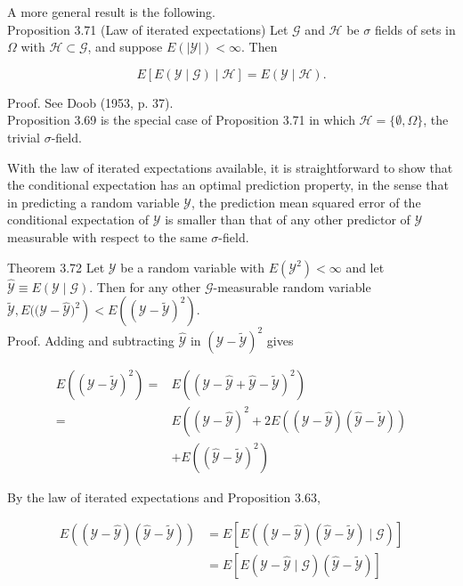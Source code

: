 \documentclass[10pt]{article}
\begin{document}
A more general result is the following.\\
Proposition 3.71 (Law of iterated expectations) Let $\mathcal{G}$ and $\mathcal{H}$ be $\sigma$ fields of sets in $\Omega$ with $\mathcal{H} \subset \mathcal{G}$, and suppose $E(|\mathcal{Y}|)<\infty$. Then

$$
E[E(\mathcal{Y} \mid \mathcal{G}) \mid \mathcal{H}]=E(\mathcal{Y} \mid \mathcal{H}) .
$$

Proof. See Doob (1953, p. 37).\\
Proposition 3.69 is the special case of Proposition 3.71 in which $\mathcal{H}= \{\emptyset, \Omega\}$, the trivial $\sigma$-field.

With the law of iterated expectations available, it is straightforward to show that the conditional expectation has an optimal prediction property, in the sense that in predicting a random variable $\mathcal{Y}$, the prediction mean squared error of the conditional expectation of $\mathcal{Y}$ is smaller than that of any other predictor of $\mathcal{Y}$ measurable with respect to the same $\sigma$-field.

Theorem 3.72 Let $\mathcal{Y}$ be a random variable with $E\left(\mathcal{Y}^{2}\right)<\infty$ and let $\hat{\mathcal{Y}} \equiv E(\mathcal{Y} \mid \mathcal{G})$. Then for any other $\mathcal{G}$-measurable random variable $\tilde{\mathcal{Y}}, E((\mathcal{Y}- \left.\hat{\mathcal{Y}})^{2}\right)<E\left((\mathcal{Y}-\tilde{\mathcal{Y}})^{2}\right)$.\\
Proof. Adding and subtracting $\hat{\mathcal{Y}}$ in $(\mathcal{Y}-\tilde{\mathcal{Y}})^{2}$ gives

$$
\begin{aligned}
E\left((\mathcal{Y}-\tilde{\mathcal{Y}})^{2}\right)= & E\left((\mathcal{Y}-\hat{\mathcal{Y}}+\hat{\mathcal{Y}}-\tilde{\mathcal{Y}})^{2}\right) \\
= & E\left((\mathcal{Y}-\hat{\mathcal{Y}})^{2}+2 E((\mathcal{Y}-\hat{\mathcal{Y}})(\hat{\mathcal{Y}}-\tilde{\mathcal{Y}}))\right. \\
& +E\left((\hat{\mathcal{Y}}-\tilde{\mathcal{Y}})^{2}\right)
\end{aligned}
$$

By the law of iterated expectations and Proposition 3.63,

$$
\begin{aligned}
E((\mathcal{Y}-\hat{\mathcal{Y}})(\hat{\mathcal{Y}}-\tilde{\mathcal{Y}})) & =E[E((\mathcal{Y}-\hat{\mathcal{Y}})(\hat{\mathcal{Y}}-\tilde{\mathcal{Y}}) \mid \mathcal{G})] \\
& =E[E(\mathcal{Y}-\hat{\mathcal{Y}} \mid \mathcal{G})(\hat{\mathcal{Y}}-\tilde{\mathcal{Y}})]
\end{aligned}
$$
\end{document}
